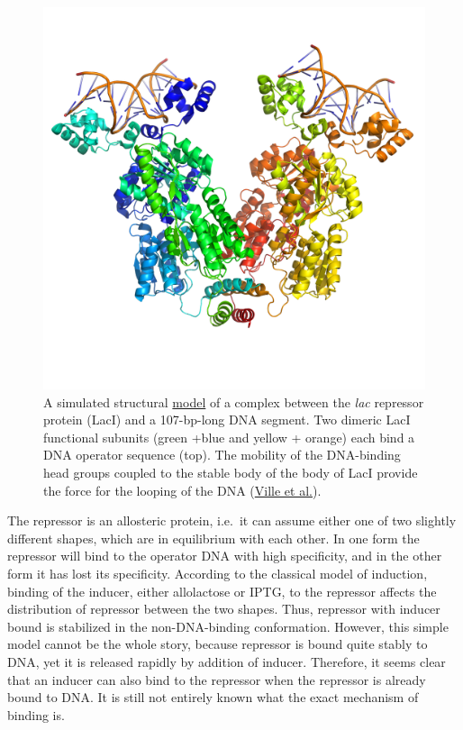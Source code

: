 \begin{figure}

{\centering \includegraphics[width=0.7\linewidth]{./figures/regulation/lac_repressor_model} 

}

\caption{A simulated structural \href{https://www.modelarchive.org/doi/10.5452/ma-cwr9z}{model} of a complex between the \emph{lac} repressor protein (LacI) and a 107-bp-long DNA segment. Two dimeric LacI functional subunits (green +blue and yellow + orange) each bind a DNA operator sequence (top). The mobility of the DNA-binding head groups coupled to the stable body of the body of LacI provide the force for the looping of the DNA (\href{https://www.pnas.org/content/102/19/6783}{Ville et al.}).}\label{fig:lacmodel}
\end{figure}

The repressor is an allosteric protein, i.e.~it can assume either one of two slightly different shapes, which are in equilibrium with each other. In one form the repressor will bind to the operator DNA with high specificity, and in the other form it has lost its specificity. According to the classical model of induction, binding of the inducer, either allolactose or IPTG, to the repressor affects the distribution of repressor between the two shapes. Thus, repressor with inducer bound is stabilized in the non-DNA-binding conformation. However, this simple model cannot be the whole story, because repressor is bound quite stably to DNA, yet it is released rapidly by addition of inducer. Therefore, it seems clear that an inducer can also bind to the repressor when the repressor is already bound to DNA. It is still not entirely known what the exact mechanism of binding is.

